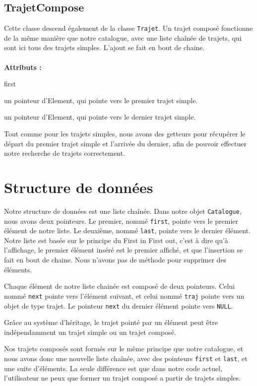 \documentclass[11pt, a4paper]{article}
\begin{document}
\subsection{TrajetCompose}
Cette classe descend également de la classe \texttt{Trajet}. Un trajet composé fonctionne de la même manière
que notre catalogue, avec une liste chaînée de trajets, qui sont ici tous des trajets simples.
L'ajout se fait en bout de chaine.\\
\\
\textbf{Attributs :}
\begin{labeling}{first}
\item [first] un pointeur d'Element, qui pointe vers le premier trajet simple.
\item [last] un pointeur d'Element, qui pointe vers le dernier trajet simple.
\end{labeling}
Tout comme pour les trajets simples, nous avons des getteurs pour récupérer le départ du premier
trajet simple et l'arrivée du dernier, afin de pouvoir effectuer notre recherche de trajets
correctement.

\section{Structure de données}
Notre structure de données est une liste chaînée. Dans notre objet \texttt{Catalogue}, nous avons deux
pointeurs. Le premier, nommé \texttt{first}, pointe vers le premier élément de notre liste. Le deuxième,
nommé \texttt{last}, pointe vers le dernier élément.
Notre liste est basée sur le principe du First in First out, c'est à dire qu'à l'affichage, le
premier élément inséré est le premier affiché, et que l'insertion se fait en bout de chaine. Nous
n'avons pas de méthode pour supprimer des éléments.

Chaque élément de notre liste chainée est composé de deux pointeurs. Celui nommé \texttt{next} pointe vers
l'élément suivant, et celui nommé \texttt{traj} pointe vers un objet de type trajet. Le pointeur
\texttt{next} du dernier élément pointe vers \texttt{NULL}.

Grâce au système d'héritage, le trajet pointé par un élément peut être indépendamment un trajet
simple ou un trajet composé.

Nos trajets composés sont formés sur le même principe que notre catalogue, et nous avons donc une
nouvelle liste chaînée, avec des pointeurs \texttt{first} et \texttt{last}, et une suite d'éléments. La seule
différence est que dans notre code actuel, l'utilisateur ne peux que former un trajet composé a
partir de trajets simples.
\end{document}
